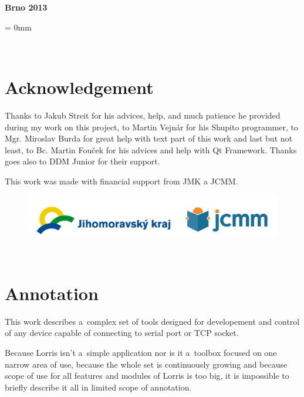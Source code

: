 \documentclass[12pt, a4paper, oneside]{article}
\newcommand{\D}{\medskip \noindent} %
\newcommand{\B}{\textbf} %
\begin{document}
\vspace{20mm}

\begin{center}
\B{Brno 2013}

\end{center}
\normalsize

\newpage   %
\voffset = 0mm %

~ %
\vspace{100mm}

\section*{Acknowledgement}
Thanks to Jakub Streit for his advices, help, and much patience he provided during my work on this project, to Martin Vejnár for his Shupito programmer, to Mgr. Miroslav Burda for great help with text part of this work and last but not least, to Bc. Martin Fouček for his advices and help with Qt Framework. Thanks goes also to DDM Junior for their support.

\D This work was made with financial support from JMK a JCMM.

\begin{figure}[H]
\begin{center}
\includegraphics[width=\textwidth]{img/jcmm.png}
\end{center}
\end{figure}
 

\newpage   %
~ %
\vspace{10mm}

\section*{Annotation}

This work describes a~complex set of tools designed for developement and control of any device capable of connecting to serial port or TCP socket.

Because Lorris isn't a~simple application nor is it a~toolbox focused on one narrow area of use, because the whole set is continuously growing and because scope of use for all features and modules of Lorris is too big, it is impossible to briefly describe it all in limited scope of annotation.
\end{document}
